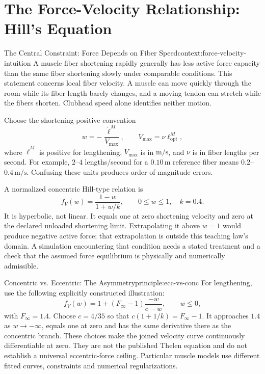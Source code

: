 \section{The Force-Velocity Relationship: Hill's Equation}

\begin{laymansbox}{The Central Constraint: Force Depends on Fiber Speed}{context:force-velocity-intuition}
A muscle fiber shortening rapidly generally has less active force capacity than the same fiber shortening slowly under comparable conditions. This statement concerns local fiber velocity. A muscle can move quickly through the room while its fiber length barely changes, and a moving tendon can stretch while the fibers shorten. Clubhead speed alone identifies neither motion.
\end{laymansbox}

Choose the shortening-positive convention
\[
w=-\frac{\dot\ell^M}{V_{\max}},
\qquad V_{\max}=\nu\ell^M_{\mathrm{opt}},
\]
where $\dot\ell^M$ is positive for lengthening, $V_{\max}$ is in $\mathrm{m/s}$, and $\nu$ is in fiber lengths per second. For example, $2$--$4$ lengths/second for a $0.10\,\mathrm{m}$ reference fiber means $0.2$--$0.4\,\mathrm{m/s}$. Confusing these units produces order-of-magnitude errors.

A normalized concentric Hill-type relation is
\begin{equation}
f_V(w)=\frac{1-w}{1+w/k},
\qquad 0\leq w\leq1,\quad k=0.4.
\label{eq:hill-concentric}
\end{equation}
It is hyperbolic, not linear. It equals one at zero shortening velocity and zero at the declared unloaded shortening limit. Extrapolating it above $w=1$ would produce negative active force; that extrapolation is outside this teaching law's domain. A simulation encountering that condition needs a stated treatment and a check that the assumed force equilibrium is physically and numerically admissible.

\begin{principle}{Concentric vs. Eccentric: The Asymmetry}{principle:ecc-vs-conc}
For lengthening, use the following explicitly constructed illustration:
\[
f_V(w)=1+(F_\infty-1)\frac{-w}{c-w},\qquad w\leq0,
\]
with $F_\infty=1.4$. Choose $c=4/35$ so that $c(1+1/k)=F_\infty-1$. It approaches $1.4$ as $w\to-\infty$, equals one at zero and has the same derivative there as the concentric branch. These choices make the joined velocity curve continuously differentiable at zero. They are not the published Thelen equation and do not establish a universal eccentric-force ceiling. Particular muscle models use different fitted curves, constraints and numerical regularizations. \citep{millard2013flexing}
\end{principle}


